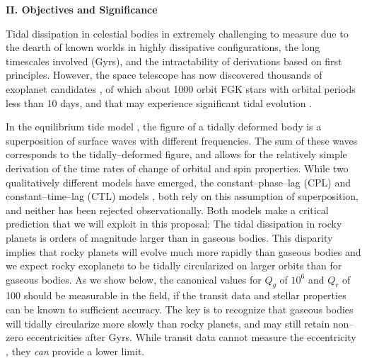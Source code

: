 \bigskip
\centerline{\bf II. Objectives and Significance}
\smallskip

\medskip
{\centerline{}}
\smallskip

Tidal dissipation in celestial bodies in extremely challenging to
measure
\citep{GoldreichSoter66,Hut81,AksnesFranklin01,Jackson08,Jackson09,Lainey12}
due to the dearth of known worlds in highly dissipative
configurations, the long timescales involved (Gyrs), and the
intractability of derivations based on first principles.  However,
the \kepler space telescope has now discovered thousands of exoplanet
candidates
\citep{2013ApJS..204...24B}, of which about 1000 orbit FGK stars with
orbital periods less than 10 days, and that may experience significant
tidal evolution \citep{Rasio96,Jackson08,Matsumura10}.

In the equilibrium tide model
\citep{Darwin1880,MacDonald64,GoldreichSoter66,Hut81,FerrazMello08,Leconte10},
the figure of a tidally deformed body is a superposition of surface
waves with different frequencies.  The sum of these waves corresponds
to the tidally--deformed figure, and allows for the relatively simple
derivation of the time rates of change of orbital and spin properties.
While two qualitatively different models have emerged, the
constant--phase--lag (CPL) and constant--time--lag (CTL) models
\citep{Greenberg09}, both rely on this assumption of superposition,
and neither has been rejected observationally.  Both models make a
critical prediction that we will exploit in this proposal: The tidal
dissipation in rocky planets is orders of magnitude larger than in
gaseous bodies.  This disparity implies that rocky planets will evolve
much more rapidly than gaseous bodies and we expect rocky exoplanets
to be tidally circularized on larger orbits than for gaseous bodies.
As we show below, the canonical values for $Q_g$ of $10^6$ and $Q_r$
of 100 should be measurable in the \kepler field, if the transit data
and stellar properties can be known to sufficient accuracy.  The key
is to recognize that gaseous bodies will tidally circularize more
slowly than rocky planets, and may still retain non--zero
eccentricities after Gyrs.  While transit data cannot measure the
eccentricity \citep{Barnes07,Burke08,Ford08}, they {\it can} provide a lower limit.

\medskip
{\centerline{}}
\smallskip

